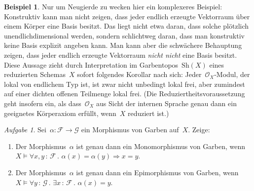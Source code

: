 \documentclass[a4paper,ngerman,12pt]{scrartcl}
\theoremstyle{definition}
\newtheorem{bsp}[defn]{Beispiel}
\theoremstyle{plain}
\theoremstyle{remark}
\newtheorem{aufg}[defn]{Aufgabe}
\newcommand{\F}{\mathcal{F}}
\newcommand{\G}{\mathcal{G}}
\renewcommand{\O}{\mathcal{O}}
\newcommand{\Sh}{\mathrm{Sh}}
\renewcommand{\_}{\mathpunct{.}\,}
\newcommand{\?}{\,{:}\,}
\begin{document}
\begin{bsp}Nur um Neugierde zu wecken hier ein komplexeres Beispiel:
Konstruktiv kann man nicht zeigen, dass jeder endlich erzeugte Vektorraum über
einem Körper eine Basis besitzt. Das liegt nicht etwa daran, dass solche
plötzlich unendlichdimensional werden, sondern schlichtweg daran, dass man
konstruktiv keine Basis explizit angeben kann. Man kann aber die schwächere
Behauptung zeigen, dass jeder endlich erzeugte Vektorraum \emph{nicht nicht}
eine Basis besitzt. Diese Aussage zieht durch Interpretation im
Garbentopos~$\Sh(X)$ eines reduzierten Schemas~$X$ sofort folgendes Korollar
nach sich: Jeder~$\O_X$-Modul, der lokal von endlichem Typ ist, ist zwar nicht
unbedingt lokal frei, aber zumindest auf einer dichten offenen Teilmenge lokal
frei. (Die Reduziertheitsvoraussetzung geht insofern ein, als dass~$\O_X$ aus
Sicht der internen Sprache genau dann ein geeignetes Körperaxiom erfüllt,
wenn~$X$ reduziert ist.)\end{bsp}

\begin{aufg}Sei~$\alpha : \F \to \G$ ein Morphismus von Garben auf~$X$. Zeige:
\begin{enumerate}
\item
Der Morphismus~$\alpha$ ist genau dann ein Monomorphismus von Garben, wenn
$X \models \forall x,y\?\F\_ \alpha(x) = \alpha(y) \Rightarrow x = y$.
\item
Der Morphismus~$\alpha$ ist genau dann ein Epimorphismus von Garben, wenn
$X \models \forall y\?\G\_ \exists x\?\F\_ \alpha(x) = y$.
\end{enumerate}
\end{aufg}
\end{document}
